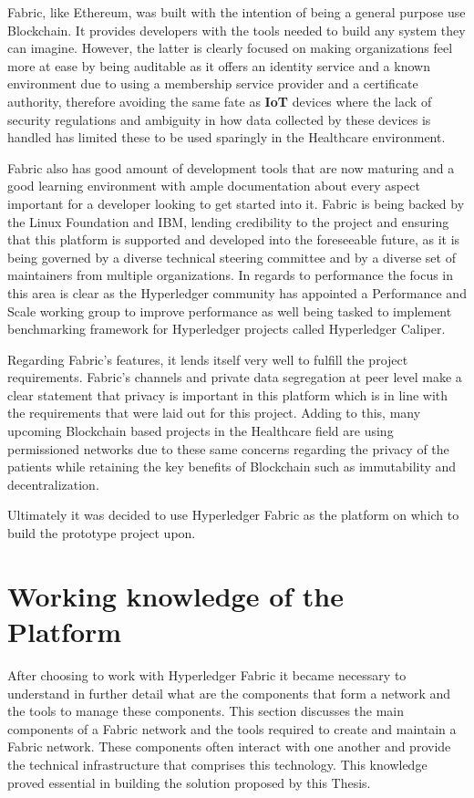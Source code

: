 Fabric, like Ethereum, was built with the intention of being a general purpose
use Blockchain. It provides developers with the tools needed to build any
system they can imagine. However, the latter is clearly focused on making
organizations feel more at ease by being auditable as it offers an identity
service and a known environment due to using a membership service provider and
a certificate authority, therefore avoiding the same fate as \textbf{IoT}
devices where the lack of security regulations and ambiguity in how data
collected by these devices is handled has limited these to be used sparingly in
the Healthcare environment.

Fabric also has good amount of development tools that are now maturing and a
good learning environment with ample documentation about every aspect important
for a developer looking to get started into it. Fabric is being backed by the
Linux Foundation and IBM, lending credibility to the project and ensuring that
this platform is supported and developed into the foreseeable future, as it is
being governed by a diverse technical steering committee and by a diverse set
of maintainers from multiple organizations. In regards to performance the focus
in this area is clear as the Hyperledger community has appointed a Performance
and Scale working group to improve performance as well being tasked to
implement benchmarking framework for Hyperledger projects called Hyperledger
Caliper.

Regarding Fabric's features, it lends itself very well to fulfill the project
requirements. Fabric's channels and private data segregation at peer level make
a clear statement that privacy is important in this platform which is in line
with the requirements that were laid out for this project. Adding to this, many
upcoming Blockchain based projects in the Healthcare field are using
permissioned networks due to these same concerns regarding the privacy of the
patients while retaining the key benefits of Blockchain such as immutability
and decentralization.

Ultimately it was decided to use Hyperledger Fabric as the platform on which to
build the prototype project upon.


\section{Working knowledge of the Platform}

After choosing to work with Hyperledger Fabric it became necessary to
understand in further detail what are the components that form a network and
the tools to manage these components. This section discusses the main
components of a Fabric network and the tools required to create and maintain a
Fabric network. These components often interact with one another and provide
the technical infrastructure that comprises this technology. This knowledge
proved essential in building the solution proposed by this Thesis.

